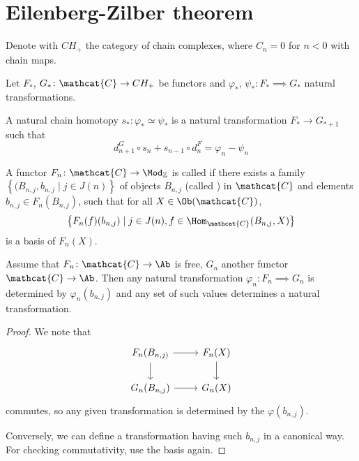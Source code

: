 \section{Eilenberg-Zilber theorem}

Denote with $CH_+$ the category of chain complexes,
where  $C_n = 0$ for  $n<0$ with chain maps.

Let $F_*$, $G_*\colon \mathcat{C} \to  CH_+$ be functors
and $\varphi _*$, $\psi _*\colon  F_* \implies G_*$ natural transformations.

\begin{definition}
  A natural chain homotopy $s_* \colon  \varphi _* \simeq \psi _*$
  is a natural transformation $F_* \to  G_{* + 1}$
  such that
  \[
  d_{n+1}^G \circ  s_n + s_{n-1} \circ  d_n^F = \varphi _n - \psi _n
  \] 
\end{definition}

\begin{definition}
  A functor $F_n\colon \mathcat{C} \to \Mod_{\mathbb{Z}}$
  is called  if there exists a family
  $\left\{(B_{n,j}, b_{n,j} \mid  j\in J(n) \right\} $ 
  of objects $B_{n,j}$ (called ) in $\mathcat{C}$
  and elements $b_{n,j} \in F_n(B_{n,j})$,
  such that for all $X\in \Ob(\mathcat{C})$,
  \[
  \left\{F_n(f) (b_{n,j}) \mid  j\in J(n), f\in \Hom_{\mathcat{C}}(B_{n,j},X) \right\} 
  \]
  is a basis of $F_n(X)$.
\end{definition}

\begin{remark}
  Assume that $F_n\colon \mathcat{C} \to  \Ab$ is free,
  $G_n$ another functor  $\mathcat{C} \to  \Ab$.
  Then any natural transformation $\varphi _n \colon F_n \implies G_n$
  is determined by $\varphi _n(b_{n,j})$
  and any set of such values determines a natural transformation.
\end{remark}

\begin{proof}
  We note that
  \[
  \begin{tikzcd}
    F_n(B_{n,j)} \ar[swap]{d}{} \ar{r}{} & F_n(X) \ar{d}{} \\
   G_n(B_{n,j})  \ar[swap]{r}{} & G_n(X)
  \end{tikzcd}
  \]
  commutes, so any given transformation is determined by the $\varphi (b_{n,j})$.

  Conversely, we can define a transformation having such $b_{n,j}$
  in a canonical way.
  For checking commutativity, use the basis again.
\end{proof}

